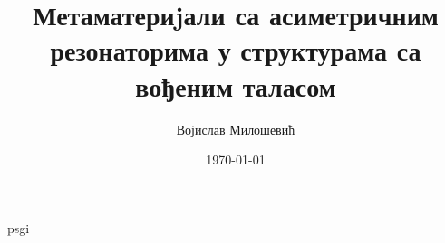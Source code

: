 \documentclass[12pt,oneside]{book}
\title{Метаматериjали са асиметричним резонаторима у структурама са вођеним таласом}
\date{\today}
\author{Војислав Милошевић}
\begin{document}
\maketitle

\tableofcontents




psgi





\end{document}
